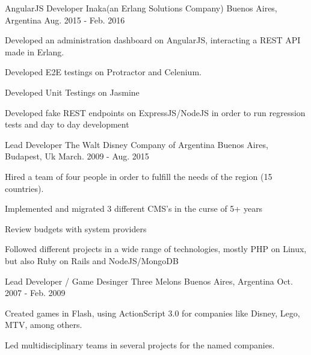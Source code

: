 \begin{cventries}
    \cventry
    {AngularJS Developer} %
    {Inaka(an Erlang Solutions Company)} %
    {Buenos Aires, Argentina} %
    {Aug. 2015 - Feb. 2016} %
    {
    \begin{cvitems} %
        \item {Developed an administration dashboard on AngularJS, interacting a REST API made in Erlang.}
        \item {Developed E2E testings on Protractor and Celenium.}
        \item {Developed Unit Testings on Jasmine}
        \item {Developed fake REST endpoints on ExpressJS/NodeJS in order to run regression tests and day to day development}
    \end{cvitems}
    }
    \cventry
    {Lead Developer} %
    {The Walt Disney Company of Argentina} %
    {Buenos Aires, Budapest, Uk} %
    {March. 2009 - Aug. 2015} %
    {
    \begin{cvitems} %
        \item {Hired a team of four people in order to fulfill the needs of the region (15 countries).}
        \item {Implemented and migrated 3 different CMS's in the curse of 5+ years}
        \item {Review budgets with system providers}
        \item {Followed different projects in a wide range of technologies, mostly PHP on Linux, but also Ruby on Rails and NodeJS/MongoDB}
    \end{cvitems}
    }

    \cventry
    {Lead Developer / Game Desinger} %
    {Three Melons} %
    {Buenos Aires, Argentina} %
    {Oct. 2007 - Feb. 2009} %
    {
    \begin{cvitems} %
        \item {Created games in Flash, using ActionScript 3.0 for companies like Disney, Lego, MTV, among others.}
        \item {Led multidisciplinary teams in several projects for the named companies.}
    \end{cvitems}
    }


\end{cventries}
